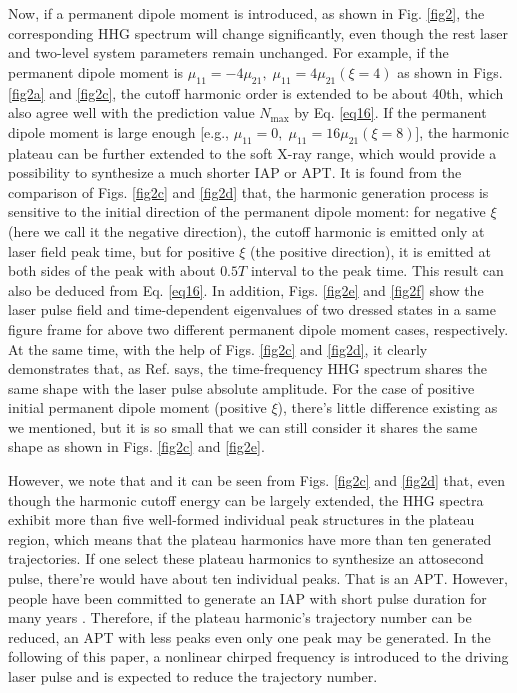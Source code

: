 \documentclass[10pt,letterpaper]{article}
\begin{document}
Now, if a permanent dipole moment is introduced, as shown in Fig. \ref{fig2}, the corresponding HHG spectrum will change significantly, even though the rest laser and two-level system parameters remain unchanged. For example, if the permanent dipole moment is $\mu_{11} =-4\mu_{21},\;\mu_{11} =4\mu_{21}(\xi=4)$ as shown in Figs. \ref{fig2a} and \ref{fig2c}, the cutoff harmonic order is extended to be about 40th, which also agree well with the prediction value $N_\textrm{max}$ by Eq. \ref{eq16}. If the permanent dipole moment is large enough [e.g., $\mu_{11} =0,\;\mu_{11} =16\mu_{21}(\xi=8)$], the harmonic plateau can be further extended to the soft X-ray range, which would provide a possibility to synthesize a much shorter IAP or APT. It is found from the comparison of Figs. \ref{fig2c} and \ref{fig2d} that, the harmonic generation process is sensitive to the initial direction of the permanent dipole moment: for negative $\xi$ (here we call it the negative direction), the cutoff harmonic is emitted only at laser field peak time, but for positive $\xi$ (the positive direction), it is emitted at both sides of the peak with about $0.5T$ interval to the peak time. This result can also be deduced from Eq. \ref{eq16}. In addition, Figs. \ref{fig2e} and \ref{fig2f} show the laser pulse field and time-dependent eigenvalues of two dressed states in a same figure frame for above two different permanent dipole moment cases, respectively. At the same time, with the help of Figs. \ref{fig2c} and \ref{fig2d}, it clearly demonstrates that, as Ref. \cite{CuiNi2010NJP-wavelet} says, the  time-frequency HHG spectrum shares the same shape with the laser pulse absolute amplitude. For the case of positive initial permanent dipole moment (positive $\xi$), there's little difference existing as we mentioned, but it is so small that we can still consider it shares the same shape as shown in Figs. \ref{fig2c} and \ref{fig2e}.      

However, we note that and it can be seen from Figs. \ref{fig2c} and \ref{fig2d} that, even though the harmonic cutoff energy can be largely extended, the HHG spectra exhibit more than five well-formed individual peak structures in the plateau region, which means that the plateau harmonics have more than ten generated trajectories. If one select these plateau harmonics to synthesize an attosecond pulse, there're would have about ten individual peaks. That is an APT. However, people have been committed to generate an IAP with short pulse duration for many years \cite{IAP-reference1-1998,IAP-reference2-2006,IAP-reference3-2008,IAP-reference4-2008,IAP-reference5-2012} . Therefore, if the plateau harmonic's trajectory number can be reduced, an APT with less peaks even only one peak may be generated. In the following of this paper, a nonlinear chirped frequency is introduced to the driving laser pulse and is expected to reduce the trajectory number. 
\end{document}
